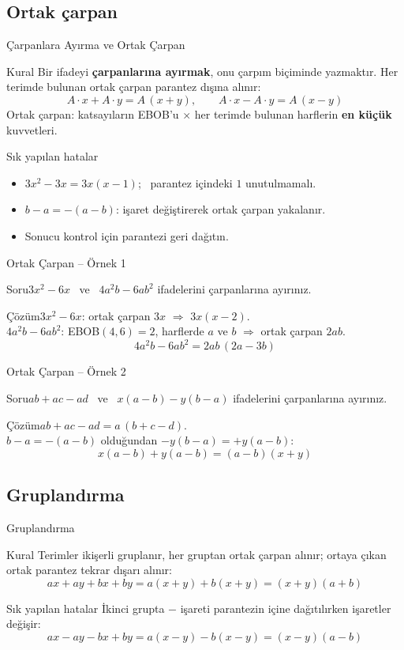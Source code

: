 \documentclass[aspectratio=169,11pt,handout]{beamer}
\newcommand{\soru}[3]{%
\begin{frame}{#1}
  \begin{block}{Soru}\large #2\end{block}
  \pause
  \begin{exampleblock}{Çözüm}\large #3\end{exampleblock}
\end{frame}}
\begin{document}
\subsection{Ortak çarpan}
\begin{frame}{Çarpanlara Ayırma ve Ortak Çarpan}
\begin{block}{Kural}
Bir ifadeyi \textbf{çarpanlarına ayırmak}, onu çarpım biçiminde yazmaktır. Her terimde bulunan ortak çarpan parantez dışına alınır:
\[A\cdot x+A\cdot y=A\,(x+y),\qquad A\cdot x-A\cdot y=A\,(x-y)\]
Ortak çarpan: katsayıların EBOB'u \(\times\) her terimde bulunan harflerin \textbf{en küçük} kuvvetleri.
\end{block}
\begin{alertblock}{Sık yapılan hatalar}
\begin{itemize}
\item \(3x^2-3x=3x(x-1)\); \ parantez içindeki \(1\) unutulmamalı.
\item \(b-a=-(a-b)\): işaret değiştirerek ortak çarpan yakalanır.
\item Sonucu kontrol için parantezi geri dağıtın.
\end{itemize}
\end{alertblock}
\end{frame}

\soru{Ortak Çarpan -- Örnek 1}
{\(3x^2-6x\) \ ve \ \(4a^2b-6ab^2\) ifadelerini çarpanlarına ayırınız.}
{\(3x^2-6x\): ortak çarpan \(3x\) \(\Rightarrow\) \(3x(x-2)\).\\[3pt]
\(4a^2b-6ab^2\): EBOB\((4,6)=2\), harflerde \(a\) ve \(b\) \(\Rightarrow\) ortak çarpan \(2ab\).
\[4a^2b-6ab^2=2ab\,(2a-3b)\]}

\soru{Ortak Çarpan -- Örnek 2}
{\(ab+ac-ad\) \ ve \ \(x(a-b)-y(b-a)\) ifadelerini çarpanlarına ayırınız.}
{\(ab+ac-ad=a\,(b+c-d)\).\\[3pt]
\(b-a=-(a-b)\) olduğundan \(-y(b-a)=+y(a-b)\):
\[x(a-b)+y(a-b)=(a-b)(x+y)\]}

\subsection{Gruplandırma}
\begin{frame}{Gruplandırma}
\begin{block}{Kural}
Terimler ikişerli gruplanır, her gruptan ortak çarpan alınır; ortaya çıkan ortak parantez tekrar dışarı alınır:
\[ax+ay+bx+by=a(x+y)+b(x+y)=(x+y)(a+b)\]
\end{block}
\begin{alertblock}{Sık yapılan hatalar}
İkinci grupta \(-\) işareti parantezin içine dağıtılırken işaretler değişir:
\[ax-ay-bx+by=a(x-y)-b(x-y)=(x-y)(a-b)\]
\end{alertblock}
\end{frame}
\end{document}
